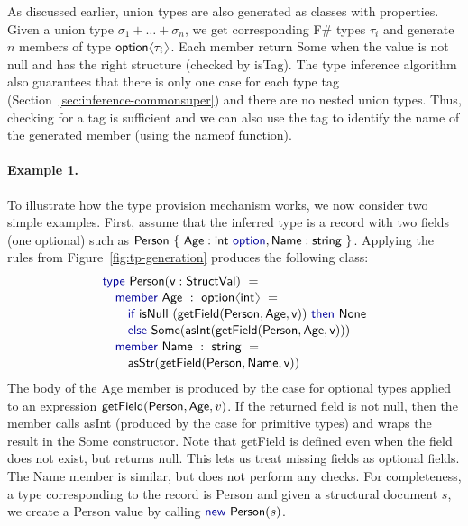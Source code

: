\documentclass[preprint]{sigplanconf}
\newcommand{\langl}{\begin{picture}(4.5,7)
\put(1.1,2.5){\rotatebox{60}{\line(1,0){5.5}}}
\put(1.1,2.5){\rotatebox{300}{\line(1,0){5.5}}}
\end{picture}}
\newcommand{\rangl}{\begin{picture}(4.5,7)
\put(.9,2.5){\rotatebox{120}{\line(1,0){5.5}}}
\put(.9,2.5){\rotatebox{240}{\line(1,0){5.5}}}
\end{picture}}
\newcommand{\kvd}[1]{\textnormal{\textcolor{kvdclr}{\sffamily #1}}}
\newcommand{\ident}[1]{\textnormal{\sffamily #1}}
\begin{document}
As discussed earlier, union types are also generated as classes with properties. Given a union type $\sigma_1 + \ldots + \sigma_n$,
we get corresponding F\# types $\tau_i$ and generate $n$ members of type $\ident{option}\langl \tau_i\rangl$.
Each member return \ident{Some} when the value is not \kvd{null} and has the right structure (checked by 
\ident{isTag}). The type inference algorithm also guarantees that there is only one case for each type tag 
(Section~\ref{sec:inference-commonsuper}) and there are no nested union types. Thus, checking for a tag is
sufficient and we can also use the tag to identify the name of the generated member (using the
\ident{nameof} function).

\paragraph{Example 1.}
To illustrate how the type provision mechanism works, we now consider two simple examples. First, assume 
that the inferred type is a record with two fields (one optional) such as 
$\ident{Person}~\{~\ident{Age}:\ident{int}~\kvd{option}, \ident{Name}:\ident{string}~ \}$. Applying the
rules from Figure~\ref{fig:tp-generation} produces the following class:
%
\begin{equation*}
\begin{array}{l}
 \kvd{type}~\ident{Person}(\ident{v}:\ident{StructVal})~= \\[0.1em]
 \quad \kvd{member}~\ident{Age}~:~\ident{option}\langl\ident{int}\rangl~= \\[0.1em]
 \qquad \kvd{if}~\ident{isNull}~(\ident{getField}(\ident{Person},\ident{Age}, \ident{v}))~\kvd{then}~\ident{None} \\[0.1em]
 \qquad \kvd{else}~\ident{Some}(\ident{asInt}(\ident{getField}(\ident{Person},\ident{Age}, \ident{v}))) \\[0.1em]
 \quad \kvd{member}~\ident{Name}~:~\ident{string}~= \\[0.1em]
 \qquad \ident{asStr}(\ident{getField}(\ident{Person},\ident{Name}, \ident{v}))
\end{array}
\end{equation*}
%
The body of the \ident{Age} member is produced by the case for optional types applied to an expression
$\ident{getField}(\ident{Person},\ident{Age},v)$. If the returned field is not \kvd{null}, then the member
calls \ident{asInt} (produced by the case for primitive types) and wraps the result in the \ident{Some}
constructor. Note that \ident{getField} is defined even when the field does not exist, but returns \ident{null}.
This lets us treat missing fields as optional fields. The \ident{Name} member is similar, but does not 
perform any checks. 
For completeness, a type corresponding to the record is \ident{Person} and given a 
structural document $s$, we create a \ident{Person} value by calling $\kvd{new}~\ident{Person}(s)$.
\end{document}
